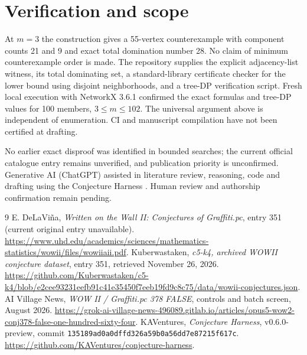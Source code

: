 \documentclass[11pt]{article}
\begin{document}
\section{Verification and scope}
At $m=3$ the construction gives a 55-vertex counterexample with component counts 21 and 9 and exact total domination number 28. No claim of minimum counterexample order is made. The repository supplies the explicit adjacency-list witness, its total dominating set, a standard-library certificate checker for the lower bound using disjoint neighborhoods, and a tree-DP verification script. Fresh local execution with NetworkX 3.6.1 confirmed the exact formulas and tree-DP values for 100 members, $3\le m\le102$. The universal argument above is independent of enumeration. CI and manuscript compilation have not been certified at drafting.

No earlier exact disproof was identified in bounded searches; the current official catalogue entry remains unverified, and publication priority is unconfirmed. Generative AI (ChatGPT) assisted in literature review, reasoning, code and drafting using the Conjecture Harness \cite{harness}. Human review and authorship confirmation remain pending.
\begin{thebibliography}{9}
 E. DeLaVi\~na, \emph{Written on the Wall II: Conjectures of Graffiti.pc}, entry 351 (current original entry unavailable). \url{https://www.uhd.edu/academics/sciences/mathematics-statistics/wowii/files/wowiiaii.pdf}.
 Kuberwastaken, \emph{c5-k4, archived WOWII conjecture dataset}, entry 351, retrieved November 26, 2026. \url{https://github.com/Kuberwastaken/c5-k4/blob/e2cee93231eefb91c41e35450f7eeb19fd9c8c75/data/wowii-conjectures.json}.
 AI Village News, \emph{WOW II / Graffiti.pc 378 FALSE}, controls and batch screen, August 2026. \url{https://grok-ai-village-news-496089.gitlab.io/articles/opus5-wow2-conj378-false-one-hundred-sixty-four}.
 KAVentures, \emph{Conjecture Harness}, v0.6.0-preview, commit \texttt{135189ad0a0dffd326a59b0a56dd7e87215f617c}. \url{https://github.com/KAVentures/conjecture-harness}.
\end{thebibliography}
\end{document}
